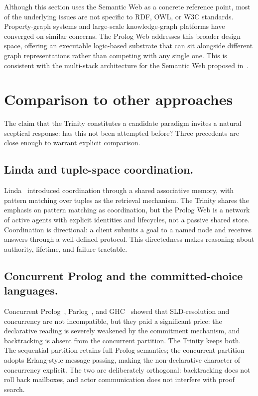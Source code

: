 Although this section uses the Semantic Web as a concrete reference
point, most of the underlying issues are not specific to RDF, OWL, or
W3C standards. Property-graph systems and large-scale knowledge-graph
platforms have converged on similar concerns. The Prolog Web addresses
this broader design space, offering an executable logic-based substrate
that can sit alongside different graph representations rather than
competing with any single one. This is consistent with the multi-stack
architecture for the Semantic Web proposed
in~\citep{Kifer2005,Horrocks2005}.


\section{Comparison to other approaches}\label{sec:paradigm-related-work}

The claim that the Trinity constitutes a candidate paradigm invites a
natural sceptical response: has this not been attempted before? Three
precedents are close enough to warrant explicit comparison.

\subsection{Linda and tuple-space coordination.}
Linda~\citep{gelernter1985generative} introduced coordination through a
shared associative memory, with pattern matching over tuples as the
retrieval mechanism. The Trinity shares the emphasis on pattern matching
as coordination, but the Prolog Web is a network of active agents with
explicit identities and lifecycles, not a passive shared store.
Coordination is directional: a client submits a goal to a named node
and receives answers through a well-defined protocol. This directedness
makes reasoning about authority, lifetime, and failure tractable.

\subsection{Concurrent Prolog and the committed-choice languages.}
Concurrent Prolog~\citep{shapiro1983subset},
Parlog~\citep{clark1986parlog}, and GHC~\citep{ueda1985guarded} showed
that SLD-resolution and concurrency are not incompatible, but they paid
a significant price: the declarative reading is severely weakened by the
commitment mechanism, and backtracking is absent from the concurrent
partition. The Trinity keeps both. The sequential partition retains full
Prolog semantics; the concurrent partition adopts Erlang-style message
passing, making the non-declarative character of concurrency explicit.
The two are deliberately orthogonal: backtracking does not roll back
mailboxes, and actor communication does not interfere with proof search.

